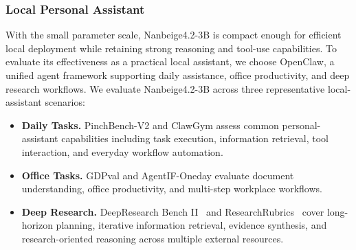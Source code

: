 \subsubsection{Local Personal Assistant}

With the small parameter scale, Nanbeige4.2-3B is compact enough for efficient local deployment while retaining strong reasoning and tool-use capabilities. To evaluate its effectiveness as a practical local assistant, we choose OpenClaw, a unified agent framework supporting daily assistance, office productivity, and deep research workflows. We evaluate Nanbeige4.2-3B across three representative local-assistant scenarios:

\begin{itemize}[leftmargin=10pt]
    \item \textbf{Daily Tasks.}
    PinchBench-V2 and ClawGym assess common personal-assistant capabilities including task execution, information retrieval, tool interaction, and everyday workflow automation.
    
    \item \textbf{Office Tasks.} 
    GDPval and AgentIF-Oneday evaluate document understanding, office productivity, and multi-step workplace workflows.
    
    \item \textbf{Deep Research.}
    DeepResearch Bench II~\cite{li2026deepresearchbenchii} and ResearchRubrics~\cite{sharma2025researchrubrics} cover long-horizon planning, iterative information retrieval, evidence synthesis, and research-oriented reasoning across multiple external resources.
\end{itemize}

